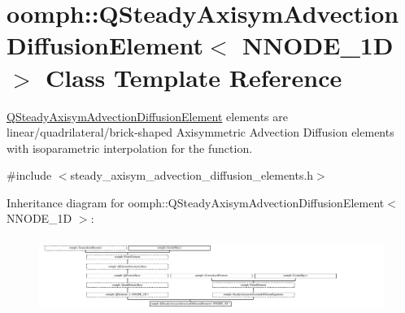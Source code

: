 \hypertarget{classoomph_1_1QSteadyAxisymAdvectionDiffusionElement}{}\section{oomph\+:\+:Q\+Steady\+Axisym\+Advection\+Diffusion\+Element$<$ N\+N\+O\+D\+E\+\_\+1D $>$ Class Template Reference}
\label{classoomph_1_1QSteadyAxisymAdvectionDiffusionElement}


\hyperlink{classoomph_1_1QSteadyAxisymAdvectionDiffusionElement}{Q\+Steady\+Axisym\+Advection\+Diffusion\+Element} elements are linear/quadrilateral/brick-\/shaped Axisymmetric Advection Diffusion elements with isoparametric interpolation for the function.  




{\ttfamily \#include $<$steady\+\_\+axisym\+\_\+advection\+\_\+diffusion\+\_\+elements.\+h$>$}

Inheritance diagram for oomph\+:\+:Q\+Steady\+Axisym\+Advection\+Diffusion\+Element$<$ N\+N\+O\+D\+E\+\_\+1D $>$\+:\begin{figure}[H]
\begin{center}
\leavevmode
\includegraphics[height=2.481013cm]{classoomph_1_1QSteadyAxisymAdvectionDiffusionElement}
\end{center}
\end{figure}
